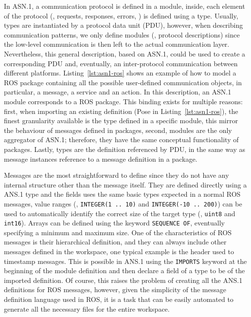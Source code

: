 In ASN.1, a communication protocol is defined in a module, inside, each element of the protocol (\eg, requests, responses, errors, \etc) is defined using a type. Usually, types are instantiated by a protocol data unit (PDU), however, when describing communication patterns, we only define modules (\ie, protocol descriptions) since the low-level communication is then left to the actual communication layer. Nevertheless, this general description, based on ASN.1, could be used to create a corresponding PDU and, eventually, an inter-protocol communication between different platforms. Listing~\ref{lst:asn1-ros} shows an example of how to model a ROS package containing all the possible user-defined communication objects, in particular, a message, a service and an action. In this description, an ASN.1 module corresponds to a ROS package. This binding exists for multiple reasons: first, when importing an existing definition (Pose in Listing~\ref{lst:asn1-ros}), the finest granularity available is the type defined in a specific module, this mirror the behaviour of messages defined in packages, second, modules are the only aggregator of ASN.1; therefore, they have the same conceptual functionality of packages. Lastly, types are the definition referenced by PDU, in the same way as message instances reference to a message definition in a package.

Messages are the most straightforward to define since they do not have any internal structure other than the message itself. They are defined directly using a ANS.1 type and the fields uses the same basic types expected in a normal ROS messages, value ranges (\eg, \texttt{INTEGER(1 .. 10)} and \texttt{INTEGER(-10 .. 200)}) can be used to automatically identify the correct size of the target type (\eg, \texttt{uint8} and \texttt{int16}). Arrays can be defined using the keyword \texttt{SEQUENCE OF}, eventually specifying a minimum and maximum size. One of the characteristics of ROS messages is their hierarchical definition, and they can always include other messages defined in the workspace, one typical example is the header used to timestamp messages. This is possible in ANS.1 using the \texttt{IMPORTS} keyword at the beginning of the module definition and then declare a field of a type to be of the imported definition. Of course, this raises the problem of creating all the ANS.1 definitions for ROS messages, however, given the simplicity of the message definition language used in ROS, it is a task that can be easily automated to generate all the necessary files for the entire workspace.

